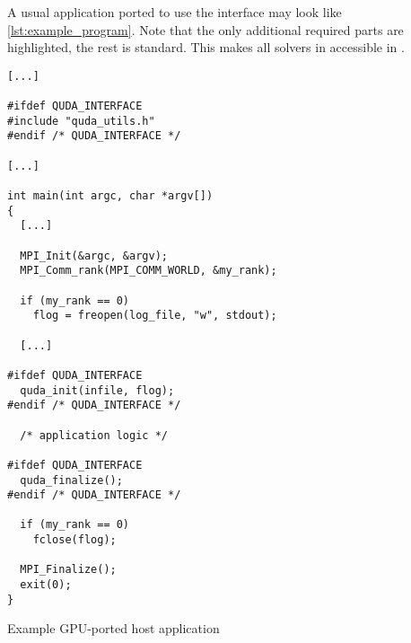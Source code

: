 

A usual application ported to use the \quda interface may look like \cref{lst:example_program}. Note that the only additional required parts are highlighted, the rest is standard.
This makes all solvers in \quda accessible in \openqxd.
\begin{codelisting}
\begin{verbatim}
[...]

#ifdef QUDA_INTERFACE
#include "quda_utils.h"
#endif /* QUDA_INTERFACE */

[...]

int main(int argc, char *argv[])
{
  [...]

  MPI_Init(&argc, &argv);
  MPI_Comm_rank(MPI_COMM_WORLD, &my_rank);

  if (my_rank == 0)
    flog = freopen(log_file, "w", stdout);

  [...]

#ifdef QUDA_INTERFACE
  quda_init(infile, flog);
#endif /* QUDA_INTERFACE */

  /* application logic */

#ifdef QUDA_INTERFACE
  quda_finalize();
#endif /* QUDA_INTERFACE */

  if (my_rank == 0)
    fclose(flog);

  MPI_Finalize();
  exit(0);
}
\end{verbatim}
\caption{Example GPU-ported host application}
\label{lst:example_program}
\end{codelisting}


